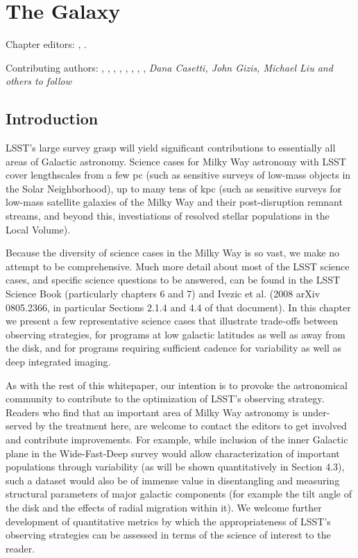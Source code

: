
\chapter{The Galaxy}
\def\chpname{galaxy}\label{chp:\chpname}

Chapter editors:
,
.

Contributing authors:
,
,
,
,
,
,
,
,
{\it Dana Casetti, John Gizis, Michael Liu and others to follow}



\section{Introduction}
\def\secname{MW_Intro}\label{sec:\secname}

LSST's large survey grasp will yield significant contributions to
essentially all areas of Galactic astronomy. Science cases for Milky
Way astronomy with LSST cover lengthscales from a few pc (such as
sensitive surveys of low-mass objects in the Solar Neighborhood), up
to many tens of kpc (such as sensitive surveys for low-mass satellite
galaxies of the Milky Way and their post-disruption remnant streams,
and beyond this, investiations of resolved stellar populations in the
Local Volume). 

Because the diversity of science cases in the Milky Way is so vast, we
make no attempt to be comprehensive. Much more detail about most of
the LSST science cases, and specific science questions to be answered,
can be found in the LSST Science Book (particularly chapters 6 and 7)
and Ivezic et al. (2008 arXiv 0805.2366, in particular Sections 2.1.4
and 4.4 of that document). In this chapter we present a few
representative science cases that illustrate trade-offs between
observing strategies, for programs at low galactic latitudes as well
as away from the disk, and for programs requiring sufficient cadence
for variability as well as deep integrated imaging. 

As with the rest of this whitepaper, our intention is to provoke the
astronomical community to contribute to the optimization of LSST's
observing strategy. Readers who find that an important area of Milky
Way astronomy is under-served by the treatment here, are welcome to
contact the editors to get involved and contribute improvements. For
example, while inclusion of the inner Galactic plane in the
Wide-Fast-Deep survey would allow characterization of important
populations through variability (as will be shown quantitatively in
Section 4.3), such a dataset would also be of immense value in
disentangling and measuring structural parameters of major galactic
components (for example the tilt angle of the disk and the effects of
radial migration within it). We welcome further development of
quantitative metrics by which the appropriateness of LSST's observing
strategies can be assessed in terms of the science of interest to the
reader.

